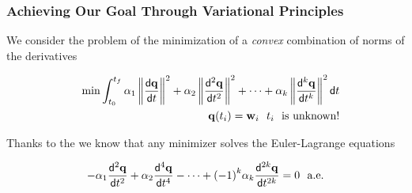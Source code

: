 \begin{frame}[t]
	\frametitle{Achieving Our Goal Through Variational Principles}

	We consider the problem of the minimization of a \emph{convex} combination of norms of the derivatives

	\begin{eqnarray*}
		&&\min \int_{t_0}^{t_f} \alpha_1 \left\|\frac{\mathsf{d} \mathbf{q}}{\mathsf{d} t}\right\|^2 + \alpha_2 \left\|\frac{\mathsf{d}^{2} \mathbf{q}}{\mathsf{d} t^{2}}\right\|^2 + \cdots  + \alpha_k \left\|\frac{\mathsf{d}^{k} \mathbf{q}}{\mathsf{d} t^{k}} \right\|^2 \mathsf{d} t \\
		&&\mathbf{q}(t_i) = \mathbf{w}_i \ \ t_i\ \text{ is unknown!}
	\end{eqnarray*}

	Thanks to the  we know that any minimizer solves the Euler-Lagrange equations

	\begin{equation*}
		-\alpha_1 \diffk{\qv}{t}{2}+ \alpha_2 \diffk{\qv}{t}{4}- \cdots +  {(-1)}^k \alpha_k \diffk{\qv}{t}{2k}= 0 \ \ \text{a.e.}
	\end{equation*}

\end{frame}

